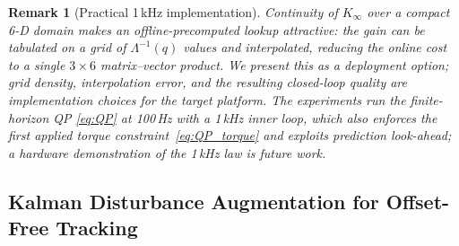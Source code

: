\documentclass[journal]{IEEEtran}
\newtheorem{remark}{Remark}
\newcommand{\Laminv}{\Lambda^{-1}(q)}
\begin{document}
\begin{remark}[Practical 1\,kHz implementation]
Continuity of $K_\infty$ over a compact 6-D domain makes an
offline-precomputed lookup attractive: the gain can be tabulated on a
grid of $\Laminv$ values and interpolated, reducing the online cost to a
single $3\times6$ matrix--vector product. We present this as a deployment
\emph{option}; grid density, interpolation error, and the resulting
closed-loop quality are implementation choices for the target platform.
The experiments run the
finite-horizon QP \eqref{eq:QP} at 100\,Hz with a 1\,kHz inner loop,
which also enforces the first applied torque constraint~\eqref{eq:QP_torque} and exploits
prediction look-ahead; a hardware demonstration of the 1\,kHz law is future work.
\end{remark}

\subsection{Kalman Disturbance Augmentation for Offset-Free Tracking}\label{sec:layer2c}
\end{document}
